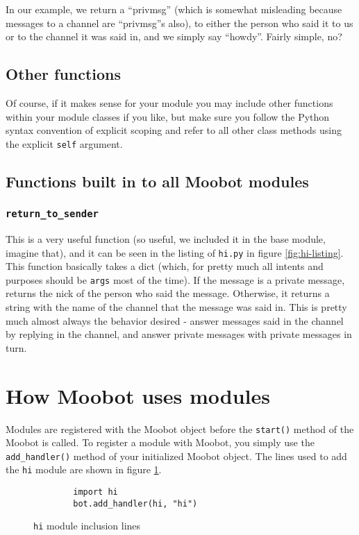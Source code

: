 \documentclass{article}[12pt]
\begin{document}
In our example, we return a ``privmsg'' (which is somewhat misleading because
messages to a channel are ``privmsg''s also), to either the person who said it
to us or to the channel it was said in, and we simply say ``howdy''.  Fairly
simple, no?

\subsection{Other functions}
Of course, if it makes sense for your module you may include other functions
within your module classes if you like, but make sure you follow the Python
syntax convention of explicit scoping and refer to all other class methods
using the explicit \texttt{self} argument.

\subsection{Functions built in to all Moobot modules}
\subsubsection{\texttt{return\_to\_sender}}
\label{sec:ret-to-send}
This is a very useful function (so useful, we included it in the base module,
imagine that), and it can be seen in the listing of \texttt{hi.py} in figure
\ref{fig:hi-listing}.  This function basically takes a dict (which, for
pretty much all intents and purposes should be \texttt{args} most of
the time).  If the message is a private message, returns the nick of the
person who said the message.  Otherwise, it returns a string with the name of
the channel that the message was said in.  This is pretty much almost always
the behavior desired - answer messages said in the channel by replying in the
channel, and answer private messages with private messages in turn.

\section{How Moobot uses modules}
Modules are registered with the Moobot object before the \texttt{start()}
method of the Moobot is called.  To register a module with Moobot, you simply
use the \texttt{add\_handler()} method of your initialized Moobot object.  The
lines used to add the \texttt{hi} module are shown in figure \ref{fig:hi-add}.

\begin{figure}[hp]
	\begin{center}
		\begin{verbatim}
		import hi
		bot.add_handler(hi, "hi")
		\end{verbatim}	
	\end{center}
	\caption{\texttt{hi} module inclusion lines}
	\label{fig:hi-add}
\end{figure}
\end{document}
